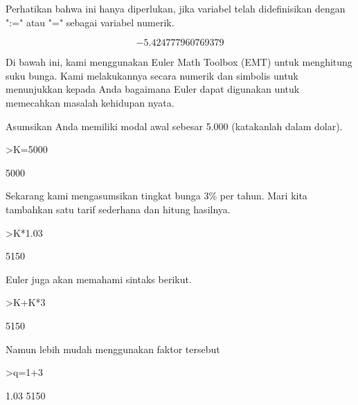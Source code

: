 \documentclass[a4paper,10pt]{article}
\begin{document}
\begin{eulernotebook}
\begin{eulercomment}
\begin{eulercomment}
\begin{eulercomment}
\begin{eulercomment}
\begin{eulercomment}
\begin{eulercomment}
\begin{eulercomment}
Perhatikan bahwa ini hanya diperlukan, jika variabel telah
didefinisikan dengan ":=" atau "=" sebagai variabel numerik.
\end{eulercomment}
\begin{eulerformula}
\[
-5.424777960769379
\]
\end{eulerformula}
\begin{eulercomment}
Di bawah ini, kami menggunakan Euler Math Toolbox (EMT) untuk
menghitung suku bunga. Kami melakukannya secara numerik dan simbolis
untuk menunjukkan kepada Anda bagaimana Euler dapat digunakan untuk
memecahkan masalah kehidupan nyata.

Asumsikan Anda memiliki modal awal sebesar 5.000 (katakanlah dalam
dolar).
\end{eulercomment}
\begin{eulerprompt}
>K=5000
\end{eulerprompt}
\begin{euleroutput}
  5000
\end{euleroutput}
\begin{eulercomment}
Sekarang kami mengasumsikan tingkat bunga 3\% per tahun. Mari kita
tambahkan satu tarif sederhana dan hitung hasilnya.
\end{eulercomment}
\begin{eulerprompt}
>K*1.03
\end{eulerprompt}
\begin{euleroutput}
  5150
\end{euleroutput}
\begin{eulercomment}
Euler juga akan memahami sintaks berikut.
\end{eulercomment}
\begin{eulerprompt}
>K+K*3%
\end{eulerprompt}
\begin{euleroutput}
  5150
\end{euleroutput}
\begin{eulercomment}
Namun lebih mudah menggunakan faktor tersebut
\end{eulercomment}
\begin{eulerprompt}
>q=1+3%
\end{eulerprompt}
\begin{euleroutput}
  1.03
  5150
\end{euleroutput}
\begin{eulercomment}

\end{eulercomment}
\end{eulercomment}
\end{eulercomment}
\end{eulercomment}
\end{eulercomment}
\end{eulercomment}
\end{eulercomment}
\end{eulernotebook}
\end{document}
